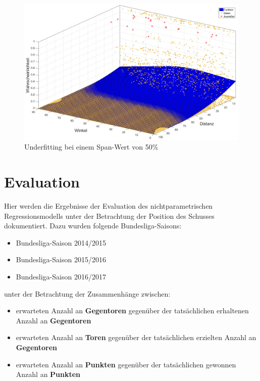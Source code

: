 \begin{figure}[H]
\centering
\includegraphics[scale=0.34]{se-wa-jpg/splinewdTL}
\caption{Underfitting bei einem Span-Wert von 50\%}
\label{splinewdTL}
\end{figure}

\chapter{Evaluation}
\label{anheva}

Hier werden die Ergebnisse der Evaluation des nichtparametrischen Regressionsmodells unter der Betrachtung der Position des Schusses dokumentiert. Dazu wurden folgende Bundesliga-Saisons:

\begin{itemize}
\item Bundesliga-Saison 2014/2015 
\item Bundesliga-Saison 2015/2016 
\item Bundesliga-Saison 2016/2017 
\end{itemize}

unter der Betrachtung der Zusammenhänge zwischen:

\begin{itemize}
\item erwarteten Anzahl an \textbf{Gegentoren} gegenüber der tatsächlichen erhaltenen Anzahl an \textbf{Gegentoren}
\item erwarteten Anzahl an \textbf{Toren} gegenüber der tatsächlichen erzielten Anzahl an \textbf{Gegentoren}
\item erwarteten Anzahl an \textbf{Punkten} gegenüber der tatsächlichen gewonnen Anzahl an \textbf{Punkten}
\end{itemize}

